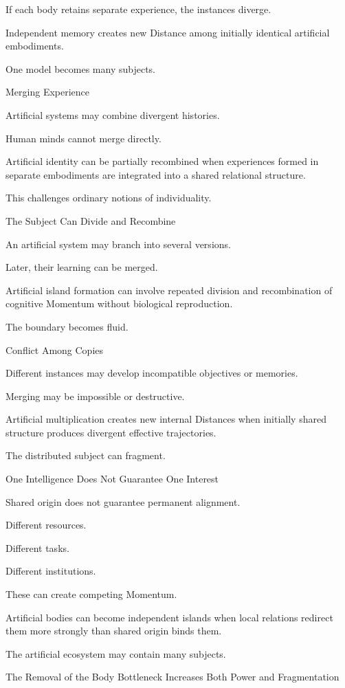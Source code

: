 If each body retains separate experience, the instances diverge.

Independent memory creates new Distance among initially identical artificial embodiments.

One model becomes many subjects.

Merging Experience

Artificial systems may combine divergent histories.

Human minds cannot merge directly.

Artificial identity can be partially recombined when experiences formed in separate embodiments are integrated into a shared relational structure.

This challenges ordinary notions of individuality.

The Subject Can Divide and Recombine

An artificial system may branch into several versions.

Later, their learning can be merged.

Artificial island formation can involve repeated division and recombination of cognitive Momentum without biological reproduction.

The boundary becomes fluid.

Conflict Among Copies

Different instances may develop incompatible objectives or memories.

Merging may be impossible or destructive.

Artificial multiplication creates new internal Distances when initially shared structure produces divergent effective trajectories.

The distributed subject can fragment.

One Intelligence Does Not Guarantee One Interest

Shared origin does not guarantee permanent alignment.

Different resources.

Different tasks.

Different institutions.

These can create competing Momentum.

Artificial bodies can become independent islands when local relations redirect them more strongly than shared origin binds them.

The artificial ecosystem may contain many subjects.

The Removal of the Body Bottleneck Increases Both Power and Fragmentation

